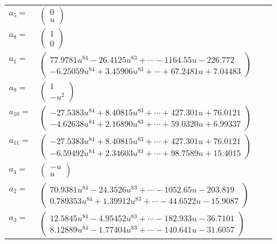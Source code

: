 \documentclass[1p]{elsarticle_modified}
\theoremstyle{definition}
\begin{document}
\begin{tabular}{m{7pt} m{180pt} m{7pt} m{180pt} }
\flushright $a_{5}=$&$\begin{pmatrix}0\\u\end{pmatrix}$ \\
\flushright $a_{8}=$&$\begin{pmatrix}1\\0\end{pmatrix}$ \\
\flushright $a_{1}=$&$\begin{pmatrix}77.9781 u^{84}-26.4125 u^{83}+\cdots-1164.55 u-226.772\\-6.25059 u^{84}+3.45906 u^{83}+\cdots+67.2481 u+7.04483\end{pmatrix}$ \\
\flushright $a_{9}=$&$\begin{pmatrix}1\\- u^2\end{pmatrix}$ \\
\flushright $a_{10}=$&$\begin{pmatrix}-27.5383 u^{84}+8.40815 u^{83}+\cdots+427.301 u+76.0121\\-4.62638 u^{84}+2.16890 u^{83}+\cdots+59.0320 u+6.99337\end{pmatrix}$ \\
\flushright $a_{11}=$&$\begin{pmatrix}-27.5383 u^{84}+8.40815 u^{83}+\cdots+427.301 u+76.0121\\-6.59492 u^{84}+2.34603 u^{83}+\cdots+98.7589 u+15.4015\end{pmatrix}$ \\
\flushright $a_{4}=$&$\begin{pmatrix}- u\\u\end{pmatrix}$ \\
\flushright $a_{2}=$&$\begin{pmatrix}70.9381 u^{84}-24.3526 u^{83}+\cdots-1052.65 u-203.819\\0.789353 u^{84}+1.39912 u^{83}+\cdots-44.6522 u-15.9087\end{pmatrix}$ \\
\flushright $a_{3}=$&$\begin{pmatrix}12.5845 u^{84}-4.95452 u^{83}+\cdots-182.933 u-36.7101\\8.12889 u^{84}-1.77404 u^{83}+\cdots-140.641 u-31.6057\end{pmatrix}$ \\

\end{tabular}
\end{document}
